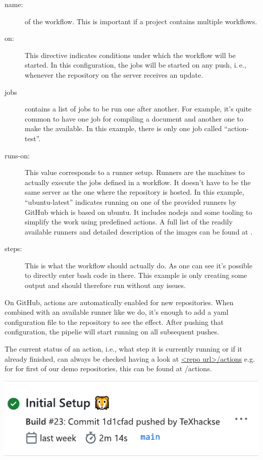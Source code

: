 \documentclass[final]{ltugboat}
\begin{document}
\begin{description}
\item[name:] of the workflow.
This is important if a project contains multiple workflows.

\item[on:] This directive indicates conditions under which the workflow will be started.
In this configuration, the jobs will be started on any push, i.\,e., whenever the repository on the server receives an update.

\item[jobs] contains a list of jobs to be run one after another.
For example, it's quite common to have one job for compiling a document and another one to make the  available.
In this example, there is only one job called \enquote{action-test}.

\item[runs-on:] This value corresponds to a runner setup.
Runners are the machines to actually execute the jobs defined in a workflow.
It doesn't have to be the same server as the one where the repository is hosted.
In this example, \enquote{ubuntu-latest} indicates running on one of the provided runners by GitHub which is based on ubuntu.
It includes nodejs and some tooling to simplify the work using predefined actions.
A full list of the readily available runners and detailed description of the images can be found at \cite{github-hosted-runners}.

\item[steps:] This is what the workflow should actually do.
As one can see it's possible to directly enter bash code in there.
This example is only creating some output and should therefore run without any issues.
\end{description}

On GitHub, actions are automatically enabled for new repositories.
When combined with an available runner like we do, it's enough to add a yaml configuration file to the repository to see the effect.
After pushing that configuration, the pipelie will start running on all subsequent pushes.

The current status of an action, i.e., what step it is currently running or if it already finished, can always be checked having a look at
\url*{<repo url>/actions} e.g. for for first of our demo repositories, this can be found at
/actions.%

\noindent\includegraphics[width=\linewidth]{screenshot-pipeline-successful}
\end{document}
